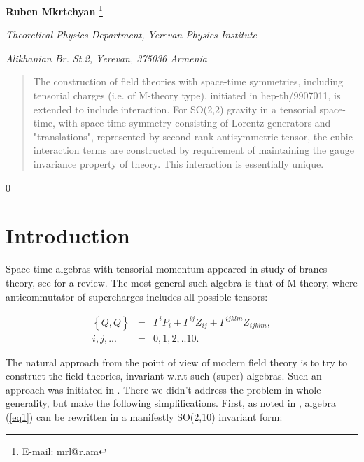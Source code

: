 \documentclass[a4paper,12pt]{article}
\begin{document}
\begin{center}

\vspace{1cm} {\bf Ruben Mkrtchyan} \footnote{ E-mail: mrl@r.am}
\vspace{1cm}

\vspace{1cm}

{\it Theoretical Physics Department,} {\it Yerevan Physics
Institute}

{\it Alikhanian Br. St.2, Yerevan, 375036 Armenia }
\end{center}

\vspace{1cm}
\begin{abstract}
The construction of field theories with space-time symmetries,
including tensorial charges (i.e. of M-theory type), initiated in
hep-th/9907011, is extended to include interaction. For SO(2,2)
gravity in a tensorial space-time, with space-time symmetry
consisting of Lorentz generators and "translations", represented
by second-rank antisymmetric tensor, the cubic interaction terms
are constructed by requirement of maintaining the gauge invariance
property of theory. This interaction is essentially unique.
\end{abstract}

\renewcommand{\thefootnote}{\arabic{footnote}} \setcounter{footnote}0
{\smallskip \pagebreak }


\section{Introduction}


Space-time algebras with tensorial momentum appeared in study of
branes theory, see \cite{Tow} for a review. The most general such
algebra is that of M-theory, where anticommutator of supercharges
includes all possible tensors:

\begin{eqnarray}
\left\{ \bar{Q},Q\right\} &=&\Gamma ^{i}P_{i}+\Gamma
^{ij}Z_{ij}+\Gamma ^{ijklm}Z_{ijklm},  \label{eq1}\\
  i,j,...
&=&0,1,2,..10. \nonumber
\end{eqnarray}


The natural approach from the point of view of modern field theory
is to try to construct the field theories, invariant w.r.t such
(super)-algebras. Such an approach was initiated in \cite{Man1}.
There we didn't address the problem in whole generality, but make
the following simplifications. First, as noted in \cite{Bars},
algebra (\ref{eq1}) can be rewritten in a manifestly SO(2,10)
invariant form:
\end{document}

